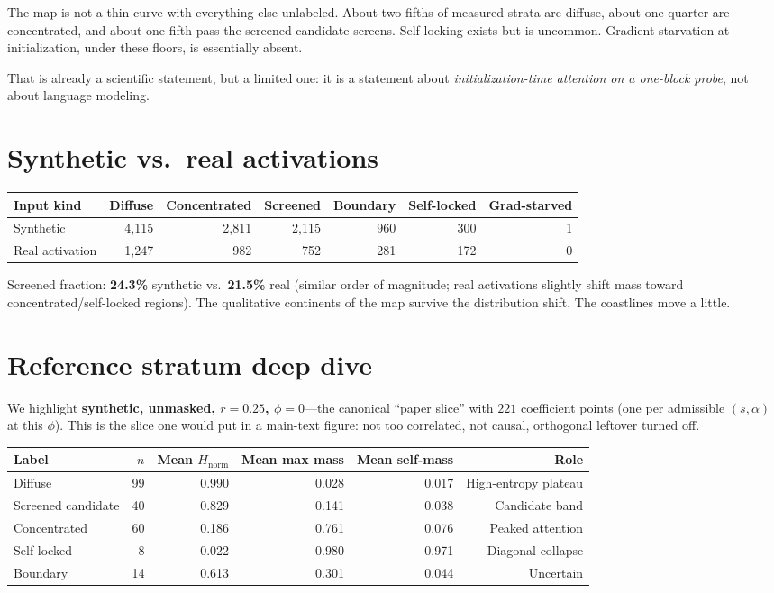 \documentclass[11pt,a4paper]{report}
\newcommand{\Hnorm}{H_{\mathrm{norm}}}
\begin{document}
The map is not a thin curve with everything else unlabeled. About two-fifths of measured strata are diffuse, about one-quarter are concentrated, and about one-fifth pass the screened-candidate screens. Self-locking exists but is uncommon. Gradient starvation at initialization, under these floors, is essentially absent.

That is already a scientific statement, but a limited one: it is a statement about \emph{initialization-time attention on a one-block probe}, not about language modeling.

\section{Synthetic vs.\ real activations}

\begin{center}
{\small
\begin{tabular}{lrrrrrr}
\toprule
Input kind & Diffuse & Concentrated & Screened & Boundary & Self-locked & Grad-starved \\
\midrule
Synthetic & 4{,}115 & 2{,}811 & 2{,}115 & 960 & 300 & 1 \\
Real activation & 1{,}247 & 982 & 752 & 281 & 172 & 0 \\
\bottomrule
\end{tabular}}
\end{center}

Screened fraction: \textbf{24.3\%} synthetic vs.\ \textbf{21.5\%} real (similar order of magnitude; real activations slightly shift mass toward concentrated/self-locked regions). The qualitative continents of the map survive the distribution shift. The coastlines move a little.

\section{Reference stratum deep dive}

We highlight \textbf{synthetic, unmasked, $r=0.25$, $\phi=0$}---the canonical ``paper slice'' with $221$ coefficient points (one per admissible $(s,\alpha)$ at this $\phi$). This is the slice one would put in a main-text figure: not too correlated, not causal, orthogonal leftover turned off.

\begin{center}
{\small
\begin{tabular}{lrrrrr}
\toprule
Label & $n$ & Mean $\Hnorm$ & Mean max mass & Mean self-mass & Role \\
\midrule
Diffuse & 99 & 0.990 & 0.028 & 0.017 & High-entropy plateau \\
Screened candidate & 40 & 0.829 & 0.141 & 0.038 & Candidate band \\
Concentrated & 60 & 0.186 & 0.761 & 0.076 & Peaked attention \\
Self-locked & 8 & 0.022 & 0.980 & 0.971 & Diagonal collapse \\
Boundary & 14 & 0.613 & 0.301 & 0.044 & Uncertain \\
\bottomrule
\end{tabular}}
\end{center}
\end{document}
